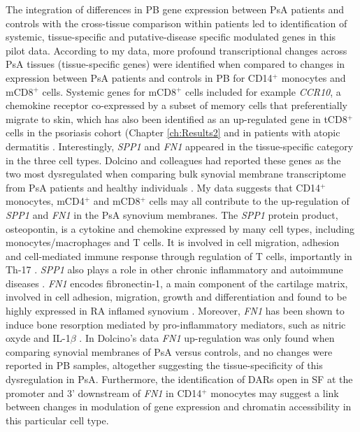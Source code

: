The integration of differences in PB gene expression between PsA patients and controls with the cross-tissue comparison within patients led to identification of systemic, tissue-specific and putative-disease specific modulated genes in this pilot data. According to my data,  more profound transcriptional changes across PsA tissues (tissue-specific genes) were identified when compared to changes in expression between PsA patients and controls in PB for CD14$^+$ monocytes and mCD8$^+$ cells. Systemic genes for mCD8$^+$ cells included for example \textit{CCR10}, a chemokine receptor co-expressed by a subset of memory cells that preferentially migrate to skin, which has also been identified as an up-regulated gene in tCD8$^+$ cells in the psoriasis cohort (Chapter \ref{ch:Results2} and in patients with atopic dermatitis \parencite{Hijnen2005}. Interestingly, \textit{SPP1} and \textit{FN1} appeared in the tissue-specific category in the three cell types. Dolcino and colleagues had reported these genes as the two most dysregulated when comparing bulk synovial membrane transcriptome from PsA patients and healthy individuals \parencite{Dolcino2015}. My data suggests that CD14$^+$ monocytes, mCD4$^+$ and mCD8$^+$ cells may all contribute to the up-regulation of \textit{SPP1} and \textit{FN1} in the PsA synovium membranes. The \textit{SPP1} protein product, osteopontin, is a cytokine and chemokine expressed by many cell types, including monocytes/macrophages and T cells. It is involved in cell migration, adhesion and cell-mediated immune response through regulation of T cells, importantly in Th-17 \parencite{Morimoto2010}. \textit{SPP1} also plays a role in other chronic inflammatory and autoimmune diseases \parencite{Rittling2015}. \textit{FN1} encodes fibronectin-1, a main component of the cartilage matrix, involved in cell adhesion, migration, growth and differentiation and found to be highly expressed in RA inflamed synovium \parencite{Chang2005}.  Moreover, \textit{FN1} has been shown to induce bone resorption mediated by pro-inflammatory mediators, such as nitric oxyde and IL-1$\beta$ \parencite{Gramoun2010}.  In Dolcino’s data \textit{FN1} up-regulation was only found when comparing synovial membranes of PsA versus controls, and no changes were reported in PB samples, altogether suggesting the tissue-specificity of this dysregulation in PsA. Furthermore, the identification of DARs open in SF at the promoter and 3’ downstream of \textit{FN1} in CD14$^+$ monocytes may suggest a link between changes in modulation of gene expression and chromatin accessibility in this particular cell type. 

